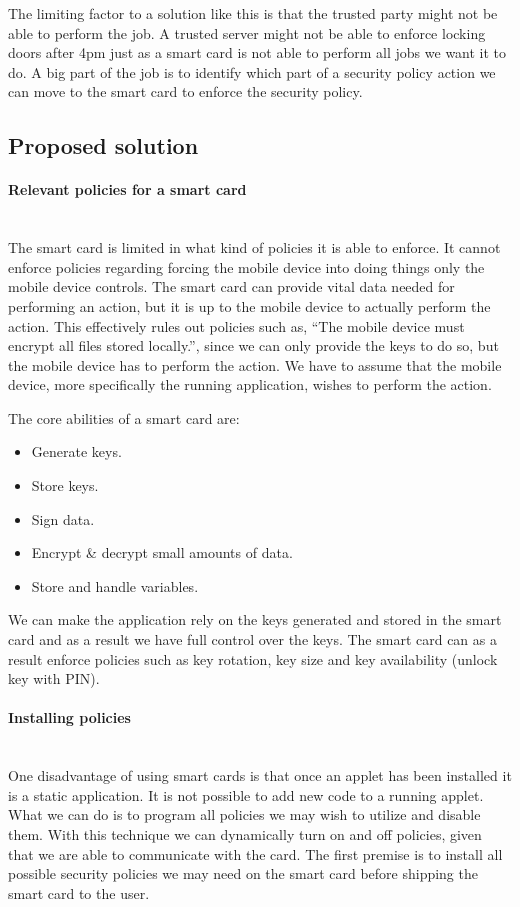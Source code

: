 The limiting factor to a solution like this is that the trusted party might not be able to perform the job. A trusted server might not be able to enforce locking doors after 4pm just as a smart card is not able to perform all jobs we want it to do. A big part of the job is to identify which part of a security policy action we can move to the smart card to enforce the security policy.

\subsection{Proposed solution}
\label{sec:policySolution}

\paragraph{Relevant policies for a smart card}\mbox{}\\
The smart card is limited in what kind of policies it is able to enforce. It cannot enforce policies regarding forcing the mobile device into doing things only the mobile device controls. The smart card can provide vital data needed for performing an action, but it is up to the mobile device to actually perform the action. This effectively rules out policies such as, ``The mobile device must encrypt all files stored locally.'', since we can only provide the keys to do so, but the mobile device has to perform the action. We have to assume that the mobile device, more specifically the running application, wishes to perform the action.

The core abilities of a smart card are:
\begin{itemize}
    \item Generate keys.
    \item Store keys.
    \item Sign data.
    \item Encrypt \& decrypt small amounts of data.
    \item Store and handle variables.
\end{itemize}

We can make the application rely on the keys generated and stored in the smart card and as a result we have full control over the keys. The smart card can as a result enforce policies such as key rotation, key size and key availability (unlock key with PIN).

\paragraph{Installing policies}\mbox{}\\
One disadvantage of using smart cards is that once an applet has been installed it is a static application. It is not possible to add new code to a running applet. What we can do is to program all policies we may wish to utilize and disable them. With this technique we can dynamically turn on and off policies, given that we are able to communicate with the card. The first premise is to install all possible security policies we may need on the smart card before shipping the smart card to the user.

